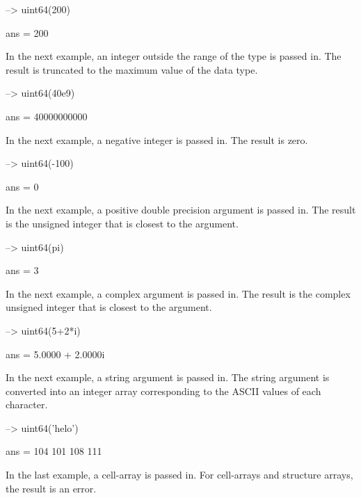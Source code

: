 \begin{DoxyVerbInclude}
--> uint64(200)

ans = 
 200 
\end{DoxyVerbInclude}


In the next example, an integer outside the range of the type is passed in. The result is truncated to the maximum value of the data type.


\begin{DoxyVerbInclude}
--> uint64(40e9)

ans = 
 40000000000 
\end{DoxyVerbInclude}


In the next example, a negative integer is passed in. The result is zero.


\begin{DoxyVerbInclude}
--> uint64(-100)

ans = 
 0 
\end{DoxyVerbInclude}


In the next example, a positive double precision argument is passed in. The result is the unsigned integer that is closest to the argument.


\begin{DoxyVerbInclude}
--> uint64(pi)

ans = 
 3 
\end{DoxyVerbInclude}


In the next example, a complex argument is passed in. The result is the complex unsigned integer that is closest to the argument.


\begin{DoxyVerbInclude}
--> uint64(5+2*i)

ans = 
   5.0000 +  2.0000i 
\end{DoxyVerbInclude}


In the next example, a string argument is passed in. The string argument is converted into an integer array corresponding to the A\-S\-C\-I\-I values of each character.


\begin{DoxyVerbInclude}
--> uint64('helo')

ans = 
 104 101 108 111 
\end{DoxyVerbInclude}


In the last example, a cell-\/array is passed in. For cell-\/arrays and structure arrays, the result is an error.


